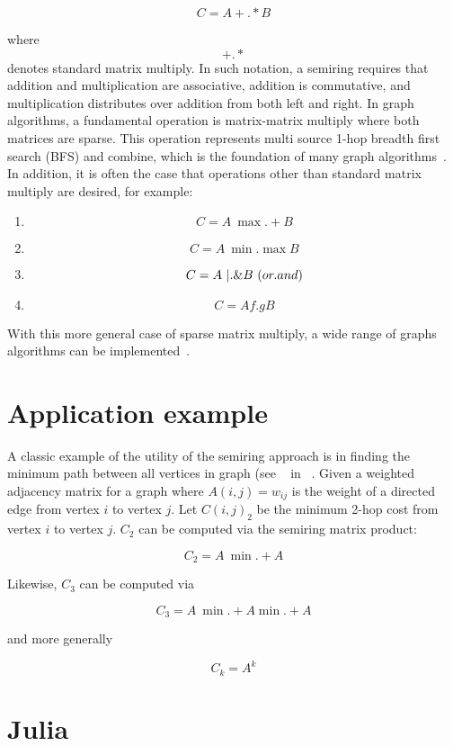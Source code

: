 \documentclass[conference]{IEEEtran}
\begin{document}
$$C = A +.* B$$

where $$+.*$$ denotes standard matrix multiply.  In such notation, a
semiring requires that addition and multiplication are associative,
addition is commutative, and multiplication distributes over addition
from both left and right.  In graph algorithms, a fundamental
operation is matrix-matrix multiply where both matrices are sparse.
This operation represents multi source 1-hop breadth first search
(BFS) and combine, which is the foundation of many graph
algorithms~\cite{shahgilbert}.  In addition, it is often the case that
operations other than standard matrix multiply are desired, for
example:

\begin{enumerate}
\item $$C = A \ {\max.+} B$$
\item $$C = A \ \min.\max B$$
\item $$C = A \ |.\& B \ ({\mbox or.and})$$
\item $$C = A f.g B $$
\end{enumerate}

With this more general case of sparse matrix multiply, a wide range of
graphs algorithms can be implemented~\cite{KepnerGilbertBook}.

\section{Application example}

A classic example of the utility of the semiring approach is in
finding the minimum path between all vertices in graph (see
~\cite{Rader} in ~\cite{KepnerGilbertBook}.  Given a weighted
adjacency matrix for a graph where $A(i,j) = w_{ij}$ is the weight of
a directed edge from vertex $i$ to vertex $j$.  Let $C(i,j)_2$ be the
minimum 2-hop cost from vertex $i$ to vertex $j$.
$C_2$ can be computed via the semiring matrix product:

$$C_2 = A \ \min.+ A$$

Likewise, $C_3$ can be computed via

$$C_3 = A\  \min.+ A \min.+ A$$

and more generally

$$C_k = A^k$$

\section{Julia}
\end{document}
